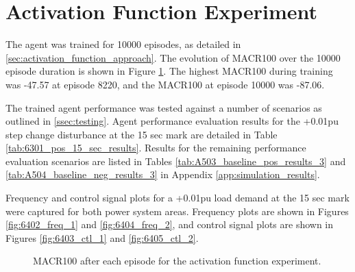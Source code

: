 \section{Activation Function Experiment}
The agent was trained for 10000 episodes, as detailed in \textsection \ref{sec:activation_function_approach}. The evolution of MACR100 over the 10000 episode duration is shown in Figure \ref{fig:6401_average_reward}. The highest MACR100 during training was -47.57 at episode 8220, and the MACR100 at episode 10000 was -87.06.

The trained agent performance was tested against a number of scenarios as outlined in \textsection \ref{ssec:testing}. Agent performance evaluation results for the +0.01pu step change disturbance at the 15 sec mark are detailed in Table \ref{tab:6301_pos_15_sec_results}. Results for the remaining performance evaluation scenarios are listed in Tables \ref{tab:A503_baseline_pos_results_3} and \ref{tab:A504_baseline_neg_results_3} in Appendix \ref{app:simulation_results}.

Frequency and control signal plots for a +0.01pu load demand at the 15 sec mark were captured for both power system areas. Frequency plots are shown in Figures \ref{fig:6402_freq_1} and \ref{fig:6404_freq_2}, and control signal plots are shown in Figures \ref{fig:6403_ctl_1} and \ref{fig:6405_ctl_2}.

\begin{figure}[h]
	\centering
	
	\caption{MACR100 after each episode for the activation function experiment.}\label{fig:6401_average_reward}
\end{figure}



